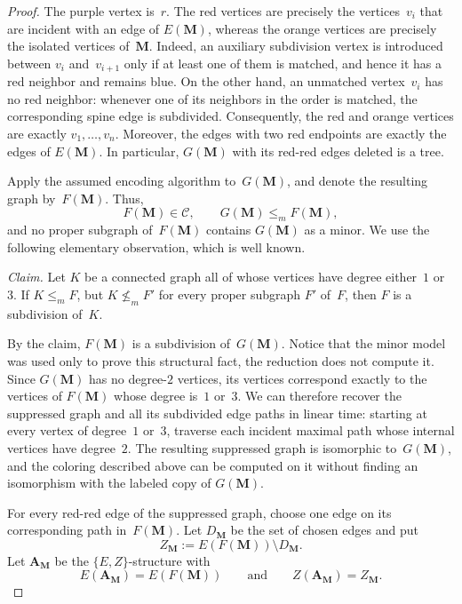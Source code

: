 \documentclass[1p,number,11pt]{elsarticle}
\theoremstyle{plain}
\newcommand{\Cc}{\mathscr{C}}
\renewcommand{\leq}{\leqslant}
\begin{document}
\begin{proof}
The purple vertex is~$r$. The red vertices are precisely the vertices~$v_i$
that are incident with an edge of $E(\mathbf M)$, whereas the orange
vertices are precisely the isolated vertices of~$\mathbf M$. Indeed, an
auxiliary subdivision vertex is introduced between $v_i$ and~$v_{i+1}$
only if at least one of them is matched, and hence it has a red neighbor and
remains blue. On the other hand, an unmatched vertex~$v_i$ has no red
neighbor: whenever one of its neighbors in the order is matched, the
corresponding spine edge is subdivided. Consequently, the red and orange
vertices are exactly $v_1,\ldots,v_n$. Moreover, the edges with two red
endpoints are exactly the edges of $E(\mathbf M)$. In particular,
$G(\mathbf M)$ with its red-red edges deleted is a tree.

Apply the assumed encoding algorithm to~$G(\mathbf M)$, and denote the
resulting graph by~$F(\mathbf M)$. Thus,
\[
    F(\mathbf M)\in\Cc,\qquad
    G(\mathbf M)\leq_m F(\mathbf M),
\]
and no proper subgraph of~$F(\mathbf M)$ contains $G(\mathbf M)$ as a
minor. We use the following elementary observation, which is well known. 

\medskip
\noindent\emph{Claim.}
Let $K$ be a connected graph all of whose vertices have degree either~$1$
or~$3$. If $K\leq_m F$, but $K\not\leq_m F'$ for every proper subgraph
$F'$ of~$F$, then $F$ is a subdivision of~$K$.

\medskip
By the claim, $F(\mathbf M)$ is a subdivision of~$G(\mathbf M)$. Notice
that the minor model was used only to prove this structural fact, the
reduction does not compute it. Since $G(\mathbf M)$ has no degree-$2$
vertices, its vertices correspond exactly to the vertices of
$F(\mathbf M)$ whose degree is~$1$ or~$3$. We can therefore recover the
suppressed graph and all its subdivided edge paths in linear time: starting
at every vertex of degree~$1$ or~$3$, traverse each incident maximal path
whose internal vertices have degree~$2$. The resulting suppressed graph is
isomorphic to~$G(\mathbf M)$, and the coloring described above can be
computed on it without finding an isomorphism with the labeled copy of
$G(\mathbf M)$.

For every red-red edge of the suppressed graph, choose one edge on its
corresponding path in~$F(\mathbf M)$. Let $D_{\mathbf M}$ be the set of
chosen edges and put
\[
    Z_{\mathbf M}:=E(F(\mathbf M))\setminus D_{\mathbf M}.
\]
Let $\mathbf A_{\mathbf M}$ be the $\{E,Z\}$-structure with
\[
    E(\mathbf A_{\mathbf M})=E(F(\mathbf M))
    \qquad\text{and}\qquad
    Z(\mathbf A_{\mathbf M})=Z_{\mathbf M}.
\]


\end{proof}
\end{document}
